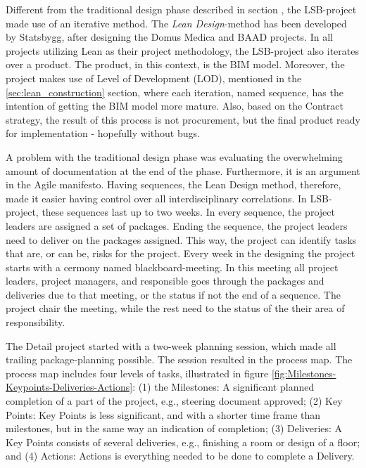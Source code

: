 Different from the traditional design phase described in section , the LSB-project made use of an iterative method. The \textit{Lean Design}-method has been developed by Statsbygg, after designing the Domus Medica and BAAD projects. In all projects utilizing Lean as their project methodology, the LSB-project also iterates over a product. The product, in this context, is the BIM model. Moreover, the project makes use of Level of Development (LOD), mentioned in the \ref{sec:lean_construction} section, where each iteration, named sequence, has the intention of getting the BIM model more mature. Also, based on the Contract strategy, the result of this process is not procurement, but the final product ready for implementation - hopefully without bugs. 

A problem with the traditional design phase was evaluating the overwhelming amount of documentation at the end of the phase. Furthermore, it is an argument in the Agile manifesto. Having sequences, the Lean Design method, therefore, made it easier having control over all interdisciplinary correlations. In LSB-project, these sequences last up to two weeks. In every sequence, the project leaders are assigned a set of packages. Ending the sequence, the project leaders need to deliver on the packages assigned. This way, the project can identify tasks that are, or can be, risks for the project. Every week in the designing the project starts with a cermony named blackboard-meeting. In this meeting all project leaders, project managers, and responsible goes through the packages and deliveries due to that meeting, or the status if not the end of a sequence. The project chair the meeting, while the rest need to the status of the their area of responsibility. 

The Detail project started with a two-week planning session, which made all trailing package-planning possible. The session resulted in the process map. The process map includes four levels of tasks, illustrated in figure \ref{fig:Milestones-Keypoints-Deliveries-Actions}: (1) the Milestones: A significant planned completion of a part of the project, e.g., steering document approved; (2) Key Points: Key Points is less significant, and with a shorter time frame than milestones, but in the same way an indication of completion; (3) Deliveries: A Key Points consists of several deliveries, e.g., finishing a room or design of a floor; and (4) Actions: Actions is everything needed to be done to complete a Delivery. 

